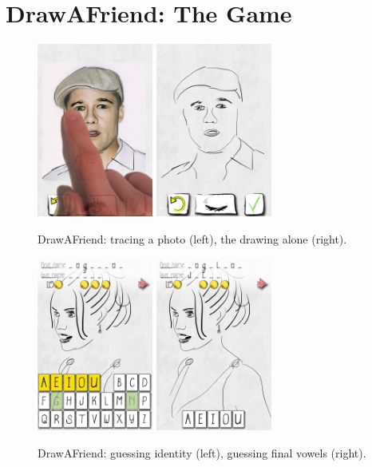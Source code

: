 \section{DrawAFriend: The Game}

\begin{figure}
  \centering%
\includegraphics[width=1.5in]{DaF/PicHand2.pdf}
\hspace{0.1in}
\includegraphics[width=1.5in]{DaF/IMG_3044.jpg}
  \caption{DrawAFriend: tracing a photo (left), the drawing alone (right).}
  \label{fig:DaF}
\end{figure}

\begin{figure}
  \centering%
\includegraphics[width=1.5in]{DaF/IMG_3032.jpg}
\hspace{0.1in}
\includegraphics[width=1.5in]{DaF/IMG_3033.jpg}
  \caption{DrawAFriend: guessing identity (left), guessing final vowels (right).}
  \label{fig:DaF2}
\end{figure}

